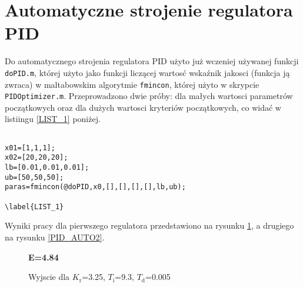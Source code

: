 \section{Automatyczne strojenie regulatora PID}

Do automatycznego strojenia regulatora PID użyto już wczeniej używanej funkcji \verb+doPID.m+, której użyto jako funkcji liczącej wartosć wskaźnik jakosci (funkcja ją zwraca) w maltabowskim algorytmie \verb+fmincon+, której użyto w skrypcie \verb+PIDOptimizer.m+. Przeprowadzono dwie próby: dla małych wartosci parametrów początkowych oraz dla dużych wartosci kryteriów początkowych, co widać w listiingu \ref{LIST_1} poniżej.

\begin{lstlisting}[style=custommatlab,frame=single,label={zad4_sim_lst},caption={Implementacja automatycznego strojenia PID},captionpos=b]

x01=[1,1,1];
x02=[20,20,20];
lb=[0.01,0.01,0.01];
ub=[50,50,50];
paras=fmincon(@doPID,x0,[],[],[],[],lb,ub);

\label{LIST_1}
\end{lstlisting}

Wyniki pracy dla pierwszego regulatora przedstawiono na rysunku \ref{PID_AUTO1}, a drugiego na rysunku \ref{PID_AUTO2}.

\begin{figure}[t]
    
    \textbf{E=\num{4.84}}
    \centering
    \caption{Wyjscie dla $K_{\mathrm{r}}$=\num{3.25},  $T_{\mathrm{i}}$=\num{9.3}, $T_{\mathrm{d}}$=\num{0.005}}
    \label {PID_AUTO1}
\end{figure}

